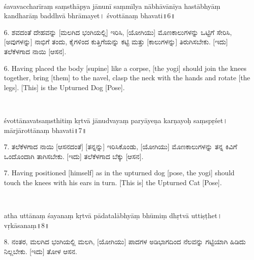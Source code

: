 \newpage

~\vskip 1cm

\dummyimage
\begin{sans}
śavavaccharīraṃ\endnote{śavavac°~] P, śavava M.} saṃsthāpya jānunī saṃmīlya nābhāvānīya hastābhyāṃ kandharāṃ baddhvā bhrāmayet। śvottānaṃ bhavati॥6॥
\end{sans}
\bigskip

\begin{kan}
6. ಶವದಂತೆ ದೇಹವನ್ನು [ಮಲಗಿದ ಭಂಗಿಯಲ್ಲಿ] ಇರಿಸಿ, [ಯೋಗಿಯು] ಮೊಣಕಾಲುಗಳನ್ನು ಒಟ್ಟಿಗೆ ಸೇರಿಸಿ, [ಅವುಗಳನ್ನು] ನಾಭಿಗೆ ತಂದು, ಕೈಗಳಿಂದ ಕುತ್ತಿಗೆಯನ್ನು ಕಟ್ಟಿ ಮತ್ತು [ಕಾಲುಗಳನ್ನು] ತಿರುಗಿಸಬೇಕು. [ಇದು] ತಲೆಕೆಳಗಾದ ನಾಯಿ [ಆಸನ].
\end{kan}
\bigskip

\begin{eng}
6. Having placed the body [supine] like a corpse, [the yogi] should join the knees together, bring [them] to the navel, clasp the neck with the hands and rotate [the legs]. [This] is the Upturned Dog [Pose].
\end{eng}


\newpage

~\vskip 1cm

\dummyimage
\begin{sans}
śvottānavatsaṃsthitiṃ kṛtvā jānudvayaṃ paryāyeṇa karṇayoḥ saṃspṛśet। mārjārottānaṃ bhavati॥7॥
\end{sans}
\bigskip

\begin{kan}
7. ತಲೆಕೆಳಗಾದ ನಾಯಿ [ಆಸನದಂತೆ] [ತನ್ನನ್ನು] ಇರಿಸಿಕೊಂಡು, [ಯೋಗಿಯು] ಮೊಣಕಾಲುಗಳನ್ನು ತನ್ನ ಕಿವಿಗೆ ಒಂದೊಂದಾಗಿ ತಾಗಿಸಬೇಕು. [ಇದು] ತಲೆಕೆಳಗಾದ ಬೆಕ್ಕು [ಆಸನ].
\end{kan}
\bigskip

\begin{eng}
7. Having positioned [himself] as in the upturned dog [pose, the yogi] should touch the knees with his ears in turn. [This is] the Upturned Cat [Pose].
\end{eng}


\newpage

~\vskip 1cm

\dummyimage
\begin{sans}
atha uttānaṃ śayanaṃ kṛtvā pādatalābhyāṃ bhūmiṃ dhṛtvā uttiṣṭhet। vṛkāsanaṃ॥8॥
\end{sans}
\bigskip

\begin{kan}
8. ನಂತರ, ಮಲಗಿದ ಭಂಗಿಯಲ್ಲಿ ಮಲಗಿ, [ಯೋಗಿಯು] ಪಾದಗಳ ಅಡಿಭಾಗದಿಂದ ನೆಲವನ್ನು ಗಟ್ಟಿಯಾಗಿ ಹಿಡಿದು ನಿಲ್ಲಬೇಕು. [ಇದು] ತೋಳ ಆಸನ.
\end{kan}
\bigskip

